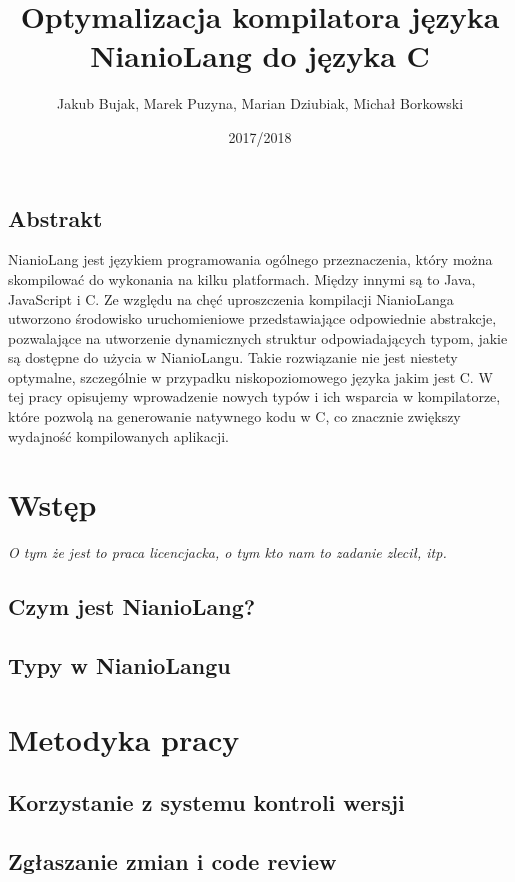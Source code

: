\documentclass[11pt]{article}
\title{Optymalizacja kompilatora języka NianioLang do języka C}
\author{Jakub Bujak, Marek Puzyna, Marian Dziubiak, Michał Borkowski}
\date{2017/2018}
\begin{document}
    \maketitle

    \subsection*{Abstrakt}
    NianioLang jest językiem programowania ogólnego przeznaczenia, który można
    skompilować do wykonania na kilku platformach. Między innymi są to Java, 
    JavaScript i C. Ze względu na chęć uproszczenia kompilacji NianioLanga
    utworzono środowisko uruchomieniowe przedstawiające odpowiednie abstrakcje,
    pozwalające na utworzenie dynamicznych struktur odpowiadających typom,
    jakie są dostępne do użycia w NianioLangu. Takie rozwiązanie nie jest
    niestety optymalne, szczególnie w przypadku niskopoziomowego języka jakim
    jest C. W tej pracy opisujemy wprowadzenie nowych typów i ich wsparcia 
    w kompilatorze, które pozwolą na generowanie natywnego kodu w C, co znacznie
    zwiększy wydajność kompilowanych aplikacji.

    \tableofcontents

    \newpage

    \section{Wstęp}
    \emph{O tym że jest to praca licencjacka, o tym kto nam to zadanie zlecił,
          itp.}
    \subsection{Czym jest NianioLang?}
    \subsection{Typy w NianioLangu}

    \section{Metodyka pracy}
    \subsection{Korzystanie z systemu kontroli wersji}
    \subsection{Zgłaszanie zmian i code review}
\end{document}

